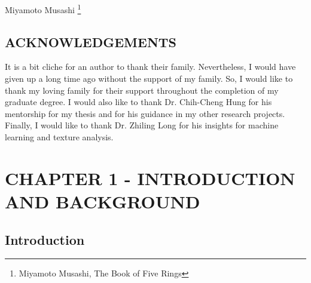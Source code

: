 \documentclass[12pt]{article}
\newcommand{\toppage}{\vspace*{0.3in}}
\begin{document}
\vspace{0.5in}
\hspace*{\fill} Miyamoto Musashi \footnote{Miyamoto Musashi, The Book of Five
    Rings}
\newpage

\toppage
\begin{center}
    \section{ACKNOWLEDGEMENTS}
\end{center}
\vspace{0.5in}

\noindent It is a bit cliche for an author to thank their family. Nevertheless,
I would have given up a long time ago without the support of my family. So, I
would like to thank my loving family for their support throughout the completion
of my graduate degree. I would also like to thank Dr. Chih-Cheng Hung for his
mentorship for my thesis and for his guidance in my other research projects.
Finally, I would like to thank Dr. Zhiling Long for his insights for machine
learning and texture analysis.
\newpage

\begin{center}
    \tableofcontents
\end{center}
\newpage

\begin{center}
    \listoffigures
\end{center}
\newpage

\begin{center}
    \listoftables
\end{center}
\newpage


\section{CHAPTER 1 - INTRODUCTION AND BACKGROUND}
\subsection{Introduction}
\end{document}
